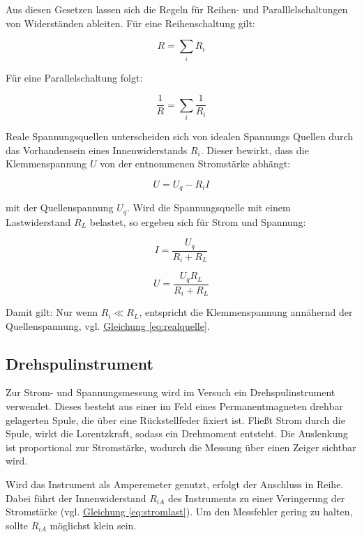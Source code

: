 Aus diesen Gesetzen lassen sich die Regeln für Reihen- und Paralllelschaltungen von Widerständen ableiten. Für eine Reihenschaltung gilt:

\begin{equation}
    R = \sum_{i} R_i
    \label{eq:reihe}
\end{equation}

Für eine Parallelschaltung folgt:

\begin{equation}
    \frac{1}{R} = \sum_{i} \frac{1}{R_i}
    \label{eq:parallel}
\end{equation}

Reale Spannungsquellen unterscheiden sich von idealen Spannungs Quellen durch das Vorhandensein eines Innenwiderstands $R_i$. Dieser bewirkt, dass die Klemmenspannung $U$ von der entnommenen Stromstärke abhängt:

\begin{equation}
    U = U_q - R_i I
    \label{eq:realquelle}
\end{equation}

mit der Quellenspannung $U_q$. Wird die Spannungsquelle mit einem Lastwiderstand $R_L$ belastet, so ergeben sich für Strom und Spannung:

\begin{equation}
    I = \frac{U_q}{R_i + R_L}
    \label{eq:stromlast}
\end{equation}

\begin{equation}
    U = \frac{U_q R_L}{R_i + R_L}
    \label{eq:spannunglast}
\end{equation}

Damit gilt: Nur wenn $R_i \ll R_L$, entspricht die Klemmenspannung annähernd der Quellenspannung, vgl. \hyperref[eq:realquelle]{Gleichung \ref*{eq:realquelle}}.

\subsection*{Drehspulinstrument}
Zur Strom- und Spannungsmessung wird im Versuch ein Drehspulinstrument verwendet. Dieses besteht aus einer im Feld eines Permanentmagneten drehbar gelagerten Spule, die über eine Rückstellfeder fixiert ist. Fließt Strom durch die Spule, wirkt die Lorentzkraft, sodass ein Drehmoment entsteht. Die Auslenkung ist proportional zur Stromstärke, wodurch die Messung über einen Zeiger sichtbar wird.

Wird das Instrument als Amperemeter genutzt, erfolgt der Anschluss in Reihe. Dabei führt der Innenwiderstand $R_{iA}$ des Instruments zu einer Veringerung der Stromstärke (vgl. \hyperref[eq:stromlast]{Gleichung \ref*{eq:stromlast}}). Um den Messfehler gering zu halten, sollte $R_{iA}$ möglichst klein sein.

